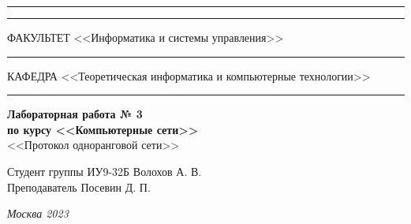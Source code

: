 \documentclass[a4paper, 14pt]{extarticle}
\begin{document}
\begin{titlepage}
\vspace{-25pt}
\hspace{-35pt}\rule{\textwidth}{2.3pt}

\vspace*{-20.3pt}
\hspace{-35pt}\rule{\textwidth}{0.4pt}

\vspace{1.5ex}
\hspace{-35pt} \noindent \small ФАКУЛЬТЕТ\hspace{80pt} <<Информатика и системы управления>>

\vspace*{-16pt}
\hspace{47pt}\rule{0.83\textwidth}{0.4pt}

\vspace{0.5ex}
\hspace{-35pt} \noindent \small КАФЕДРА\hspace{50pt} <<Теоретическая информатика и компьютерные технологии>>

\vspace*{-16pt}
\hspace{30pt}\rule{0.866\textwidth}{0.4pt}
  
\vspace{11em}

\begin{center}
\Large {\bf Лабораторная работа № 3} \\ 
\large {\bf по курсу <<Компьютерные сети>>} \\
\large <<Протокол одноранговой сети>> 
\end{center}\normalsize

\vspace{8em}


\begin{flushright}
  {Студент группы ИУ9-32Б Волохов А. В. \hspace*{15pt}\\ 
  \vspace{2ex}
  Преподаватель Посевин Д. П.\hspace*{15pt}}
\end{flushright}

\bigskip

\vfill
 

\begin{center}
\textsl{Москва 2023}
\end{center}
\end{titlepage}
\end{document}
